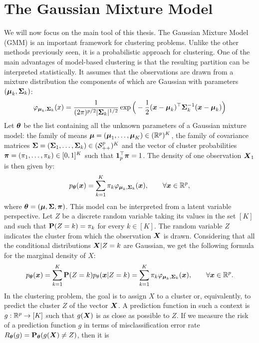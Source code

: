 \section{The Gaussian Mixture Model}
We will now focus on the main tool of this thesis. The Gaussian Mixture Model (GMM) is an important framework for clustering problems. Unlike the other methods previously seen, it is a probabilistic approach for clustering. One of the main advantages of model-based clustering is that the resulting partition can be interpreted statistically. It assumes that the observations are drawn from a
mixture distribution the components of which are Gaussian  with parameters $(\boldsymbol\mu_k,\boldsymbol\Sigma_k)$:
\begin{equation}
\varphi_{\boldsymbol\mu_k,\boldsymbol\Sigma_k}(x)=\frac{1}{(2\pi)^{p/2}|\boldsymbol\Sigma_k|^{1/2}} \exp\Big(-\frac{1}{2}(\boldsymbol x-\boldsymbol\mu_k)^\top\boldsymbol\Sigma_k^{-1}(\boldsymbol x-\boldsymbol\mu_k)\Big)
\end{equation}
Let ${\boldsymbol\theta}$ be the list containing all the unknown parameters of a Gaussian mixture model: the family of means $\boldsymbol\mu = (\boldsymbol\mu_1,\ldots,\boldsymbol\mu_K)
\in ({\mathbb R}^p)^K$, the family of covariance matrices $\boldsymbol\Sigma = (\boldsymbol\Sigma_1,\ldots,\boldsymbol\Sigma_k)\in(\mathcal S_{++}^p)^K$ and the vector of cluster probabilities  $\boldsymbol \pi=(\pi_1,\ldots,\pi_k)\in [0,1]^K$ such that $\b1_p^\top\bpi=1$.
The density of one observation $\boldsymbol X_1$ is then given by:
\begin{equation}\label{mixture}
p_{{\boldsymbol\theta}}(\boldsymbol x)=\sum_{k=1}^K\pi_k\varphi_{\boldsymbol\mu_k,\boldsymbol\Sigma_k}(\boldsymbol x),\qquad \forall \boldsymbol x\in{\mathbb R}^p,
\end{equation}
where ${\boldsymbol\theta}=(\boldsymbol\mu,\boldsymbol\Sigma,\boldsymbol \pi)$.
This model can be interpreted from a latent variable perspective. Let $Z$ be a discrete random variable
taking its values in the set $[K]$ and such that $\mathbf P(Z=k) = \pi_k$ for every $k\in[K]$. The random variable $Z$
indicates the cluster from which the observation $\boldsymbol X$ is drawn.  Considering that all the conditional distributions
$\boldsymbol X|Z=k$ are Gaussian, we get the following formula for the marginal density of $X$:
\begin{equation}
p_{{\boldsymbol\theta}}(\boldsymbol x)=\sum_{k=1}^K \mathbf P(Z=k)p_{\theta}(\boldsymbol x|Z=k) = \sum_{k=1}^K\pi_k\varphi_{\boldsymbol\mu_k,\boldsymbol\Sigma_k}(\boldsymbol x),\qquad \forall \boldsymbol x\in{\mathbb R}^p.
\end{equation}
In the clustering problem, the goal is to assign $X$ to a cluster or, equivalently, to predict the cluster $Z$ of the vector $\boldsymbol X$.
A prediction function in such a context is $g:{\mathbb R}^p\to[K]$ such that $g(\boldsymbol X)$ is as close as possible to $Z$. If we measure the
risk of a prediction function $g$ in terms of misclassification error rate $R_{\boldsymbol\theta}(g) = \mathbf P_{\boldsymbol\theta}(g(\boldsymbol X)\not=Z)$, then it is
